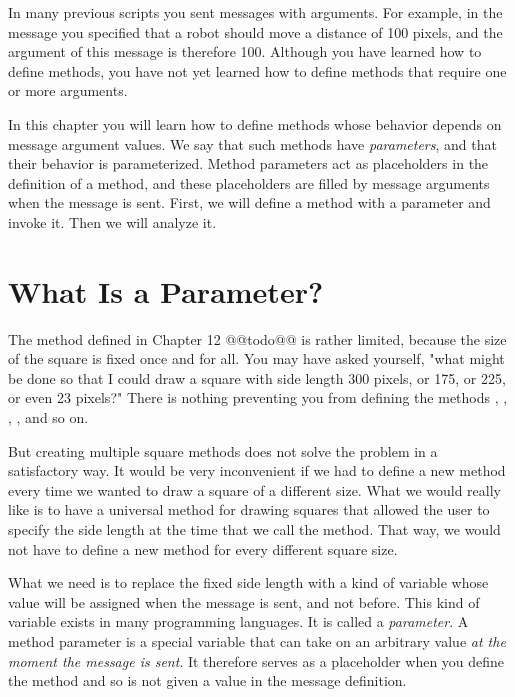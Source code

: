 \documentclass[a4paper,10pt,twoside]{book}
\begin{document}
In many previous scripts you sent messages with arguments. For example, in the message 
 you specified that a robot should move a distance of 100 pixels, and the argument of 
this message is therefore 100. Although you have learned how to define methods, you have not 
yet learned how to define methods that require one or more arguments. 

In this chapter you will learn how to define methods whose behavior depends on message 
argument values. We say that such methods have \emph{parameters}, and that their behavior is parameterized. Method parameters act as placeholders in the definition of a method, and these 
placeholders are filled by message arguments when the message is sent. First, we will define 
a method with a parameter and invoke it. Then we will analyze it. 



\section{What Is a Parameter?} 


The method  defined in Chapter 12 @@todo@@ is rather limited, because the size of the square is 
fixed once and for all. You may have asked yourself, "what might be done so that I could draw 
a square with side length 300 pixels, or 175, or 225, or even 23 pixels?" There is nothing preventing you from defining the methods , , , , and so on. 

But creating multiple square methods does not solve the problem in a satisfactory way. It 
would be very inconvenient if we had to define a new method every time we wanted to draw a 
square of a different size. What we would really like is to have a universal method for drawing 
squares that allowed the user to specify the side length at the time that we call the method. 
That way, we would not have to define a new method for every different square size. 

What we need is to replace the fixed side length with a kind of variable whose value will 
be assigned when the message is sent, and not before. This kind of variable exists in many 
programming languages. It is called a \emph{parameter}. A method parameter is a special variable that can 
take on an arbitrary value \emph{at the moment the message is sent}. It therefore serves as a placeholder 
when you define the method and so is not given a value in the message definition. 
\end{document}
